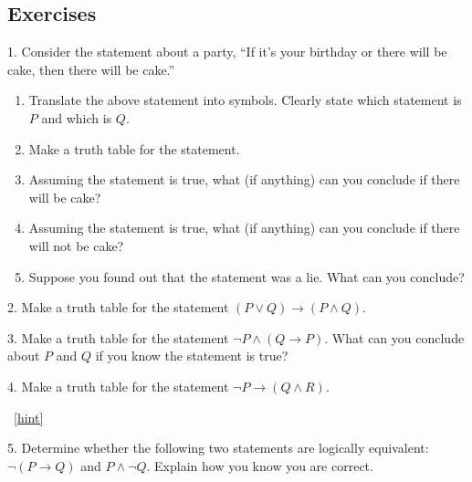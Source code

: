 \documentclass[10pt,]{book}
\theoremstyle{plain}
\theoremstyle{definition}
\theoremstyle{definition}
\theoremstyle{definition}
\numberwithin{equation}{chapter}
\def\imp{\rightarrow}
\begin{document}
\subsection*{Exercises}\label{exercises_sec-logic}
\begin{exerciselist}
\item[1.]\hypertarget{exercise-99}{}\hypertarget{p-2351}{}%
Consider the statement about a party, ``If it's your birthday or there will be cake, then there will be cake.''%
\par
\hypertarget{p-2352}{}%
\leavevmode%
\begin{enumerate}[label=(\alph*)]
\item\hypertarget{li-474}{}\hypertarget{p-2353}{}%
Translate the above statement into symbols. Clearly state which statement is \(P\) and which is \(Q\).%
\item\hypertarget{li-475}{}\hypertarget{p-2354}{}%
Make a truth table for the statement.%
\item\hypertarget{li-476}{}\hypertarget{p-2355}{}%
Assuming the statement is true, what (if anything) can you conclude if there will be cake?%
\item\hypertarget{li-477}{}\hypertarget{p-2356}{}%
Assuming the statement is true, what (if anything) can you conclude if there will not be cake?%
\item\hypertarget{li-478}{}\hypertarget{p-2357}{}%
Suppose you found out that the statement was a lie. What can you conclude?%
\end{enumerate}
%
\par\smallskip
\item[2.]\hypertarget{exercise-100}{}\hypertarget{p-2363}{}%
Make a truth table for the statement \((P \vee Q) \imp (P \wedge Q)\).%
\par\smallskip
\item[3.]\hypertarget{exercise-101}{}\hypertarget{p-2364}{}%
Make a truth table for the statement \(\neg P \wedge (Q \imp P)\). What can you conclude about \(P\) and \(Q\) if you know the statement is true?%
\par\smallskip
\item[4.]\hypertarget{exercise-102}{}\hypertarget{p-2366}{}%
Make a truth table for the statement \(\neg P \imp (Q \wedge R)\).%
\par\smallskip
~\hfill{\tiny\hyperlink{a-B.4.4}{[hint]}\hypertarget{q-B.4.4}{}}\item[5.]\hypertarget{exercise-103}{}\hypertarget{p-2368}{}%
Determine whether the following two statements are logically equivalent:  \(\neg(P \imp Q)\) and \(P \wedge \neg Q\). Explain how you know you are correct.%

\end{exerciselist}
\end{document}
